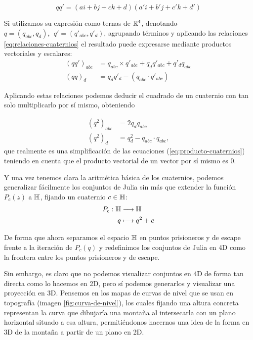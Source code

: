 \begin{equation}
    qq' = (a i + b j + c k + d)(a' i + b' j + c' k + d') 
\end{equation}

Si utilizamos su expresión como ternas de $\mathbb{R}^4$, denotando $q=(q_{abc},q_d),  \  \ q'=(q'_{abc},q'_d)$, agrupando términos y aplicando las relaciones \ref{eq:relaciones-cuaternios} el resultado puede expresarse mediante productos vectoriales y escalares:
\begin{equation}
    \label{eq:producto-cuaternios}
    \begin{split}
        (qq')_{abc} &= q_{abc}\times q'_{abc} + q_d q'_{abc} + q'_d q_{abc} \\
        (qq)_d &= q_d q'_d - (q_{abc}\cdot q'_{abc})
    \end{split}
\end{equation}

Aplicando estas relaciones podemos deducir el cuadrado de un cuaternio con tan solo multiplicarlo por sí mismo, obteniendo

\begin{equation}
    \label{eq:cuadrado-cuaternio}
    \begin{split}
        (q^2)_{abc} &= 2q_d q_{abc} \\
        (q^2)_d &= q_d^2 - q_{abc}\cdot q_{abc},
    \end{split}
\end{equation}
que realmente es una simplificación de las ecuaciones (\ref{eq:producto-cuaternios}) teniendo en cuenta que el producto vectorial de un vector por sí mismo es $0$.

Y una vez tenemos clara la aritmética básica de los cuaternios, podemos generalizar fácilmente los conjuntos de Julia sin más que extender la función $P_c(z)$ a $\mathbb{H}$, fijando un cuaternio $c\in\mathbb{H}$:
\begin{equation}
    \label{eq:f-julia-cuaternios}
    \begin{split}
        P_c : \mathbb{H} & \longrightarrow \mathbb{H} \\
        q & \longmapsto q^2 + c
    \end{split}
\end{equation}

De forma que ahora separamos el espacio $\mathbb{H}$ en puntos prisioneros y de escape frente a la iteración de $P_c(q)$ y redefinimos los conjuntos de Julia en 4D como la frontera entre los puntos prisioneros y de escape. 

Sin embargo, es claro que no podemos visualizar conjuntos en 4D de forma tan directa como lo hacemos en 2D, pero sí podemos generarlos y visualizar una proyección en 3D. Pensemos en los mapas de curvas de nivel que se usan en topografía (imagen \ref{fig:curva-de-nivel}), los cuales fijando una altura concreta representan la curva que dibujaría una montaña al intersecarla con un plano horizontal situado a esa altura, permitiéndonos hacernos una idea de la forma en 3D de la montaña a partir de un plano en 2D. 

